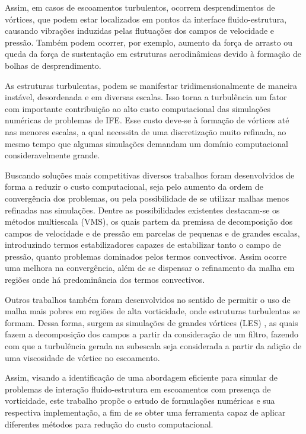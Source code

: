 Assim, em casos de escoamentos turbulentos, ocorrem desprendimentos de vórtices, que podem estar localizados em pontos da interface fluido-estrutura, causando vibrações induzidas pelas flutuações dos campos de velocidade e pressão. Também podem ocorrer, por exemplo, aumento da força de arrasto ou queda da força de sustentação em estruturas aerodinâmicas devido à formação de bolhas de desprendimento.

As estruturas turbulentas, podem se manifestar tridimensionalmente de maneira instável, desordenada e em diversas escalas. Isso torna a turbulência um fator com importante contribuição ao alto custo computacional das simulações numéricas de problemas de IFE. Esse custo deve-se à formação de vórtices até nas menores escalas, a qual necessita de uma discretização muito refinada, ao mesmo tempo que algumas simulações demandam um domínio computacional consideravelmente grande.

Buscando soluções mais competitivas diversos trabalhos foram desenvolvidos de forma a reduzir o custo computacional, seja pelo aumento da ordem de convergência dos problemas, ou pela possibilidade de se utilizar malhas menos refinadas nas simulações. Dentre as possibilidades existentes destacam-se os métodos multiescala (VMS), os quais partem da premissa de decomposição dos campos de velocidade e de pressão em parcelas de pequenas e de grandes escalas, introduzindo termos estabilizadores capazes de estabilizar tanto o campo de pressão, quanto problemas dominados pelos termos convectivos. Assim ocorre uma melhora na convergência, além de se dispensar o refinamento da malha em regiões onde há predominância dos termos convectivos.

Outros trabalhos também foram desenvolvidos no sentido de permitir o uso de malha mais pobres em regiões de alta vorticidade, onde estruturas turbulentas se formam. Dessa forma, surgem as simulações de grandes vórtices (LES) \cite{smagorinsky1963general}, as quais fazem a decomposição dos campos a partir da consideração de um filtro, fazendo com que a turbulência gerada na subescala seja considerada a partir da adição de uma viscosidade de vórtice no escoamento.

Assim, visando a identificação de uma abordagem eficiente para simular de problemas de interação fluido-estrutura em escoamentos com presença de vorticidade, este trabalho propõe o estudo de formulações numéricas e sua respectiva implementação, a fim de se obter uma ferramenta capaz de aplicar diferentes métodos para redução do custo computacional.

